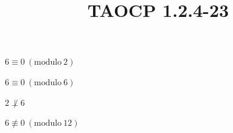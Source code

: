 \documentclass{article}
\title{TAOCP 1.2.4\mbox{-}23}
\begin{document}
\maketitle

\( 6 \equiv 0\ (\mathrm{modulo}\ 2) \)

\( 6 \equiv 0\ (\mathrm{modulo}\ 6) \)

\( 2 \not\perp 6 \)

\( 6 \not\equiv 0\ (\mathrm{modulo}\ 12) \)
\end{document}
